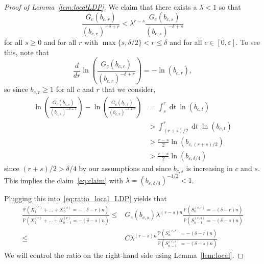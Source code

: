 \documentclass[AHL,Unicode,longabstracts,published]{cedram}
\renewcommand{\P}{\mathbb{P}}
\DeclareMathOperator{\dtseq}{d\mathit{t}}
\begin{document}
\begin{proof}[Proof of Lemma~\ref{lem:localLDP}]
We claim that there exists a $\lambda<1$ so that
\begin{equation}\label{eq:claim}
\frac{G_c(b_{c,r}) }{ (b_{c,r})^{ -\delta+r }} <\lambda^{r-s} \frac{ G_c(b_{c,s})}{ (b_{c,s})^{ -\delta+s}}
\end{equation}
for all $s\geq 0$ and for all $r$ with $\max\{s,\delta/2\}< r\le \delta $ and for all $c\in[0,\varepsilon]$. To see this, note that
\[
\frac{d}{dr} \ln\left(\frac{G_c(b_{c,r}) }{ (b_{c,r})^{-\delta+r } }\right)=-\ln(b_{c,r}),
\]
so since $ b_{c,r} \ge1$ for all $c$ and $r$ that we consider,
\begin{align*}
\ln\left(\frac{G_c(b_{c,s}) }{ (b_{c,s})^{-\delta+s }}\right)-\ln\left(\frac{G_c(b_{c,r}) }{ (b_{c,r})^{-\delta+r }}\right)&=\int_s^r \dtseq \ln(b_{c,t})\\
&>\int_{(r+s)/2}^r \dtseq \ln(b_{c,t})\\
&>\frac{r-s}{2}\ln(b_{c,(r+s)/2})\\
&>\frac{r-s}{2}\ln(b_{\varepsilon,\delta/4})
\end{align*}
since $(r+s)/2>\delta/4$ by our assumptions and since $b_{c,s}$ is increasing in $c$ and $s$. This implies the claim~\eqref{eq:claim} with $\lambda=(b_{\varepsilon,\delta/4})^{-1/2}<1$.

Plugging this into~\eqref{eq:ratio_local_LDP} yields that
\begin{align*}
\frac{\P\left(X^{(c)}_1+\dots+X^{(c)}_{n}= -(\delta-r)n\right)}{
\P\left(X^{(c)}_1+\dots+X^{(c)}_{n-1}=-(\delta-s)n\right)}\leq &G_c(b_{c,s}) \lambda^{(r-s)n} \frac{\P\left(S^{(c,r)}_n=-(\delta-r)n\right) }{ \P\left(S^{(c,s)}_{n-1}=-(\delta-s)n\right)}\\
\leq&C \lambda^{(r-s)n} \frac{\P\left(S^{(c,r)}_n=-(\delta-r)n\right) }{ \P\left(S^{(c,s)}_{n-1}=-(\delta-s)n\right)}
\end{align*}
We will control the ratio on the right-hand side using Lemma~\ref{lem:local}.


\end{proof}
\end{document}
